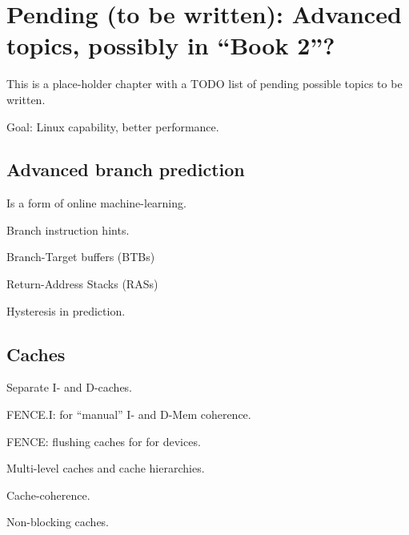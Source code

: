 

\chapter{Pending (to be written): Advanced topics, possibly in ``Book 2''?}


\setcounter{page}{1}
\renewcommand{\thepage}{\arabic{chapter}-\arabic{page}}

\label{ch_Pending}


This is a place-holder chapter with a TODO list of pending possible
topics to be written.

Goal: Linux capability, better performance.

\hdivider


\section{Advanced branch prediction}

Is a form of online machine-learning.

Branch instruction hints.

Branch-Target buffers (BTBs)

Return-Address Stacks (RASs)

Hysteresis in prediction.


\section{Caches}

Separate I- and D-caches.

FENCE.I: for ``manual'' I- and D-Mem coherence.

FENCE: flushing caches for for devices.

Multi-level caches and cache hierarchies.

Cache-coherence.

Non-blocking caches.


